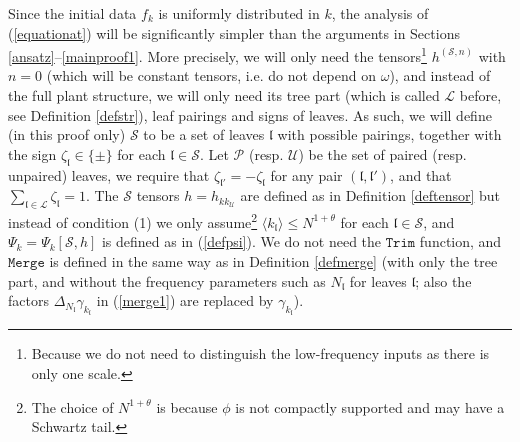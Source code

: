 \documentclass[11 pt,reqno]{amsart}
\theoremstyle{definition}
\theoremstyle{remark}
\numberwithin{equation}{section}
\newcommand{\Sc}{\mathcal{S}}
\newcommand{\Lc}{\mathcal{L}}
\newcommand{\Pc}{\mathcal{P}}
\newcommand{\Uc}{\mathcal{U}}
\newcommand{\lf}{\mathfrak{l}}
\begin{document}
{ Since the initial data $f_k$ is uniformly distributed in $k$, the analysis of (\ref{equationat}) will be significantly simpler than the arguments in Sections \ref{ansatz}--\ref{mainproof1}. More precisely, we will only need the tensors\footnote{Because we do not need to distinguish the low-frequency inputs as there is only one scale.} $h^{(\Sc,n)}$ with $n=0$ (which will be constant tensors, i.e. do not depend on $\omega$), and instead of the full plant structure, we will only need its tree part (which is called $\Lc$ before, see Definition \ref{defstr}), leaf pairings and signs of leaves. As such, we will define (in this proof only) $\Sc$ to be a set of leaves $\lf$ with possible pairings, together with the sign $\zeta_\lf\in\{\pm\}$ for each $\lf\in\Sc$. Let $\Pc$ (resp. $\Uc$) be the set of paired (resp. unpaired) leaves, we require that $\zeta_{\lf'}=-\zeta_\lf$ for any pair $(\lf,\lf')$, and that $\sum_{\lf\in\Lc}\zeta_\lf=1$. The $\Sc$ tensors $h=h_{kk_\Uc}$ are defined as in Definition \ref{deftensor} but instead of condition (1) we only assume\footnote{The choice of $N^{1+\theta}$ is because $\phi$ is not compactly supported and may have a Schwartz tail.} $\langle k_\lf\rangle\leq N^{1+\theta}$ for each $\lf\in\Sc$, and $\Psi_k=\Psi_k[\Sc,h]$ is defined as in (\ref{defpsi}). We do not need the $\mathtt{Trim}$ function, and $\mathtt{Merge}$ is defined in the same way as in Definition \ref{defmerge} (with only the tree part, and without the frequency parameters such as $N_\lf$ for leaves $\lf$; also the factors $\Delta_{N_\lf}\gamma_{k_\lf}$ in (\ref{merge1}) are replaced by $\gamma_{k_\lf}$).
 
}
\end{document}

